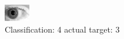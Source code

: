 \begin{figure}[h!]
\begin{center}
\includegraphics[width=0.60\columnwidth]{figures/ID267_class_4_target_3.png}
\end{center}
\caption{ Classification: 4 actual target: 3}
\label{fig:ID267_class_4_target_3}
\end{figure}
